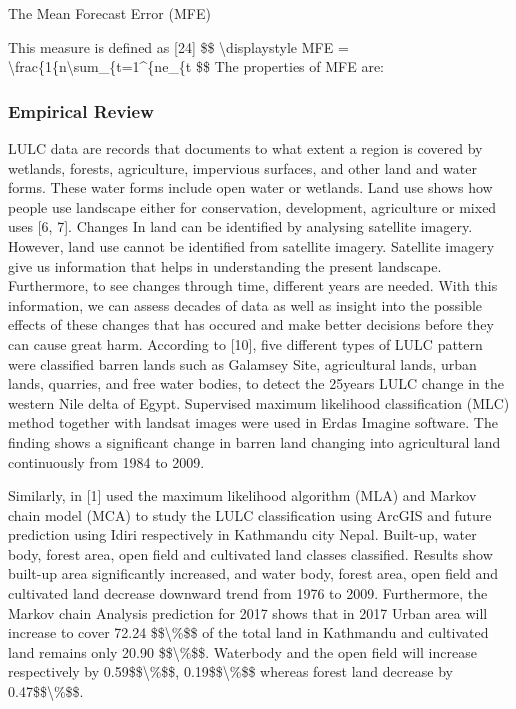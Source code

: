 \documentclass[
  letterpaper,
  DIV=11,
  numbers=noendperiod]{scrartcl}
\begin{document}
The Mean Forecast Error (MFE)

This measure is defined as {[}24{]} \$\$ \textbackslash displaystyle MFE
= \textbackslash frac\{1\{n\textbackslash sum\_\{t=1\^{}\{ne\_\{t \$\$
The properties of MFE are:

\hypertarget{empirical-review}{%
\subsubsection{Empirical Review}\label{empirical-review}}

LULC data are records that documents to what extent a region is covered
by wetlands, forests, agriculture, impervious surfaces, and other land
and water forms. These water forms include open water or wetlands. Land
use shows how people use landscape either for conservation, development,
agriculture or mixed uses {[}6, 7{]}. Changes In land can be identified
by analysing satellite imagery. However, land use cannot be identified
from satellite imagery. Satellite imagery give us information that helps
in understanding the present landscape. Furthermore, to see changes
through time, different years are needed. With this information, we can
assess decades of data as well as insight into the possible effects of
these changes that has occured and make better decisions before they can
cause great harm. According to {[}10{]}, five different types of LULC
pattern were classified barren lands such as Galamsey Site, agricultural
lands, urban lands, quarries, and free water bodies, to detect the
25years LULC change in the western Nile delta of Egypt. Supervised
maximum likelihood classification (MLC) method together with landsat
images were used in Erdas Imagine software. The finding shows a
significant change in barren land changing into agricultural land
continuously from 1984 to 2009.

Similarly, in {[}1{]} used the maximum likelihood algorithm (MLA) and
Markov chain model (MCA) to study the LULC classification using ArcGIS
and future prediction using Idiri respectively in Kathmandu city Nepal.
Built-up, water body, forest area, open field and cultivated land
classes classified. Results show built-up area significantly increased,
and water body, forest area, open field and cultivated land decrease
downward trend from 1976 to 2009. Furthermore, the Markov chain Analysis
prediction for 2017 shows that in 2017 Urban area will increase to cover
72.24 \$\$\textbackslash\%\$\$ of the total land in Kathmandu and
cultivated land remains only 20.90 \$\$\textbackslash\%\$\$. Waterbody
and the open field will increase respectively by
0.59\$\$\textbackslash\%\$\$, 0.19\$\$\textbackslash\%\$\$ whereas
forest land decrease by 0.47\$\$\textbackslash\%\$\$.
\end{document}
